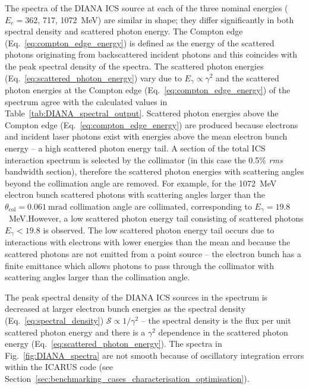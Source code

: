 \documentclass[../main.tex]{subfiles}
\begin{document}
The spectra of the DIANA ICS source at each of the three nominal energies ($E_{e} = $362, 717, 1072~\si{\mega\electronvolt}) are similar in shape; they differ significantly in both spectral density and scattered photon energy. The Compton edge (Eq.~\ref{eq:compton_edge_energy}) is defined as the energy of the scattered photons originating from backscattered incident photons and this coincides with the peak spectral density of the spectra. The scattered photon energies (Eq.~\ref{eq:scattered_photon_energy}) vary due to $E_{\gamma}\propto\gamma^{2}$ and the scattered photon energies at the Compton edge (Eq.~\ref{eq:compton_edge_energy}) of the spectrum agree with the calculated values in Table~\ref{tab:DIANA_spectral_output}. Scattered photon energies above the Compton edge (Eq.~\ref{eq:compton_edge_energy}) are produced because electrons and incident laser photons exist with energies above the mean electron bunch energy -- a high scattered photon energy tail. A section of the total ICS interaction spectrum is selected by the collimator (in this case the 0.5\% \textit{rms} bandwidth section), therefore the scattered photon energies with scattering angles beyond the collimation angle are removed. For example, for the 1072~\si{\mega\electronvolt} electron bunch scattered photons with scattering angles larger than the  $\theta_{\mathrm{col}} = 0.061~\si{\milli\radian}$ collimation angle are collimated, corresponding to $E_{\gamma} = 19.8$~\si{\mega\electronvolt}.However, a low scattered photon energy tail consisting of scattered photons $E_{\gamma} < 19.8$ is observed. The low scattered photon energy tail occurs due to interactions with 
electrons with lower energies than the mean and because the scattered photons are not emitted from a point source -- the electron bunch has a finite emittance which allows photons to pass through the collimator with scattering angles larger than the collimation angle.

The peak spectral density of the DIANA ICS sources in the spectrum is decreased at larger electron bunch energies as the spectral density (Eq.~\ref{eq:spectral_density}) $\mathcal{S} \propto 1/\gamma^{2}$ -- the spectral density is the flux per unit scattered photon energy and there is a $\gamma^{2}$ dependence in the scattered photon energy (Eq.~\ref{eq:scattered_photon_energy}). The spectra in Fig.~\ref{fig:DIANA_spectra} are not smooth because of oscillatory integration errors within the \textsc{ICARUS} code (see Section~\ref{sec:benchmarking_cases_characterisation_optimisation}).
\end{document}

